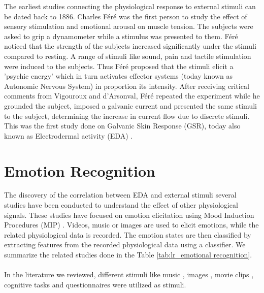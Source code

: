 
The earliest studies connecting the physiological response to external stimuli can be dated back to 1886. Charles F\'er\'e was the first person to study the effect of sensory stimulation and emotional arousal on muscle tension. The subjects were asked to grip a dynamometer while a stimulus was presented to them. F\'er\'e noticed that the strength of the subjects increased significantly under the stimuli compared to resting. A range of stimuli like sound, pain and tactile stimulation were induced to the subjects. Thus F\'er\'e proposed that the stimuli elicit a 'psychic energy' which in turn activates effector systems (today known as Autonomic Nervous System) in proportion its intensity. After receiving critical comments from Vigouroux and d'Arsonval, F\'er\'e repeated the experiment while he grounded the subject, imposed a galvanic current and presented the same stimuli to the subject, determining the increase in current flow due to discrete stimuli. This was the first study done on Galvanic Skin Response (GSR), today also known as Electrodermal activity (EDA) \cite{neumann_early_1970}.

\section{Emotion Recognition} \label{sec:emo_rec} The discovery of the correlation between EDA and external stimuli several studies have been conducted to understand the effect of other physiological signals. These studies have focused on emotion elicitation using Mood Induction Procedures (MIP) \cite{gross_emotion_1995}. Videos, music or images are used to elicit emotions, while the related physiological data is recorded. The emotion states are then classified by extracting features from the recorded physiological data using a classifier. We summarize the related studies done in the Table \ref{tab:lr_emotional recognition}.

\paragraph{} In the literature we reviewed, different stimuli like music \cite{kim_emotion_2008} , images \cite{kanade_emotion_2004} \cite{kordic_emotion_2010}, movie clips \cite{lisetti_using_2004} \cite{wan_wen_2009} \cite{schulze_cnn_2016}, cognitive tasks and questionnaires \cite{grimm_bimodal_2007} were utilized as stimuli. 

